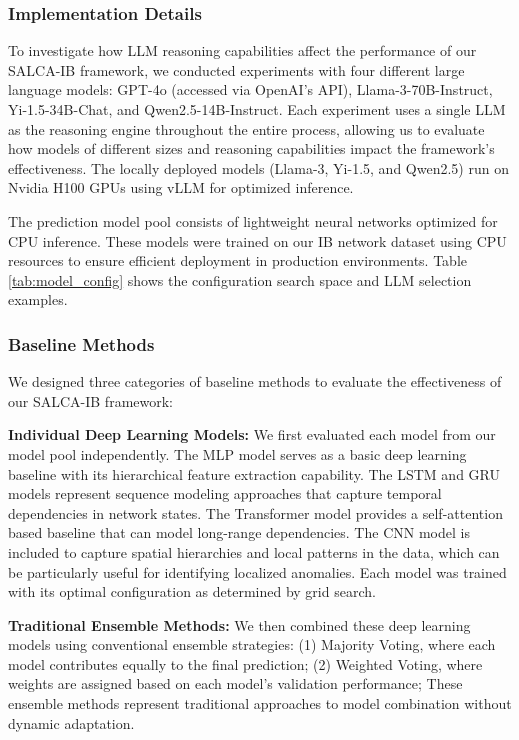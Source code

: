 \documentclass[conference]{IEEEtran}
\begin{document}
\subsubsection{Implementation Details}
To investigate how LLM reasoning capabilities affect the performance of our SALCA-IB framework, we conducted experiments with four different large language models: GPT-4o (accessed via OpenAI's API), Llama-3-70B-Instruct, Yi-1.5-34B-Chat, and Qwen2.5-14B-Instruct. Each experiment uses a single LLM as the reasoning engine throughout the entire process, allowing us to evaluate how models of different sizes and reasoning capabilities impact the framework's effectiveness. The locally deployed models (Llama-3, Yi-1.5, and Qwen2.5) run on Nvidia H100 GPUs using vLLM for optimized inference.

The prediction model pool consists of lightweight neural networks optimized for CPU inference. These models were trained on our IB network dataset using CPU resources to ensure efficient deployment in production environments. Table \ref{tab:model_config} shows the configuration search space and LLM selection examples.

\subsubsection{Baseline Methods}
We designed three categories of baseline methods to evaluate the effectiveness of our SALCA-IB framework:

\textbf{Individual Deep Learning Models:} We first evaluated each model from our model pool independently. The MLP model serves as a basic deep learning baseline with its hierarchical feature extraction capability. The LSTM and GRU models represent sequence modeling approaches that capture temporal dependencies in network states. The Transformer model provides a self-attention based baseline that can model long-range dependencies. The CNN model is included to capture spatial hierarchies and local patterns in the data, which can be particularly useful for identifying localized anomalies. Each model was trained with its optimal configuration as determined by grid search.

\textbf{Traditional Ensemble Methods:} We then combined these deep learning models using conventional ensemble strategies:
(1) Majority Voting, where each model contributes equally to the final prediction;
(2) Weighted Voting, where weights are assigned based on each model's validation performance;
These ensemble methods represent traditional approaches to model combination without dynamic adaptation.
\end{document}
